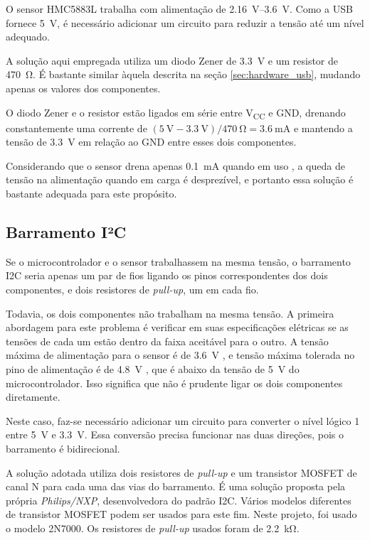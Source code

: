 \documentclass[brazil,pagestart=firstchapter]{abnt}
\newcommand*{\VCC}{V\textsubscript{CC}\xspace}
\newcommand*{\GND}{GND\xspace}
\begin{document}
O sensor HMC5883L trabalha com alimentação de \SIrange{2.16}{3.6}{\volt}.
\cite[p.~2]{HMC5883L} Como a \ac{USB} fornece \SI{5}{\volt}, é necessário
adicionar um circuito para reduzir a tensão até um nível adequado.

A solução aqui empregada utiliza um diodo Zener de \SI{3.3}{\volt} e um
resistor de \SI{470}{\ohm}. \cite{3vtipsandtricks} É bastante similar àquela
descrita na seção \ref{sec:hardware_usb}, mudando apenas os valores dos
componentes.

O diodo Zener e o resistor estão ligados em série entre \VCC e \GND,
drenando constantemente uma corrente de $ (\SI{5}{\volt} - \SI{3.3}{\volt})
/ \SI{470}{\ohm} = \SI{3.6}{\milli\ampere} $ e mantendo a tensão de
\SI{3.3}{\volt} em relação ao \GND entre esses dois componentes.

Considerando que o sensor drena apenas \SI{0.1}{\milli\ampere} quando em
uso \cite[p.~2]{HMC5883L}, a queda de tensão na alimentação quando em carga
é desprezível, e portanto essa solução é bastante adequada para este
propósito.

\subsection{Barramento I²C}
\label{sub:hardware_sensor_i2c}

Se o microcontrolador e o sensor trabalhassem na mesma tensão, o barramento
\ac{I2C} seria apenas um par de fios ligando os pinos correspondentes dos
dois componentes, e dois resistores de \textit{pull-up}, um em cada fio.

Todavia, os dois componentes não trabalham na mesma tensão. A primeira
abordagem para este problema é verificar em suas especificações elétricas se
as tensões de cada um estão dentro da faixa aceitável para o outro.
\cite[p.~9]{AN97055} A tensão máxima de alimentação para o sensor é de
\SI{3.6}{\volt} \cite[p.~2]{HMC5883L}, e tensão máxima tolerada no pino de
alimentação é de \SI{4.8}{\volt} \cite[p.~3]{HMC5883L}, que é abaixo da
tensão de \SI{5}{\volt} do microcontrolador. Isso significa que não é
prudente ligar os dois componentes diretamente.

Neste caso, faz-se necessário adicionar um circuito para converter o nível
lógico 1 entre \SI{5}{\volt} e \SI{3.3}{\volt}. Essa conversão precisa
funcionar nas duas direções, pois o barramento é bidirecional.

A solução adotada utiliza dois resistores de \textit{pull-up} e um
transistor MOSFET de canal N para cada uma das vias do barramento. É uma
solução proposta pela própria \textit{Philips/NXP}, desenvolvedora do padrão
\ac{I2C}. \cite[p.~10]{AN97055} \cite{AN10441} Vários modelos diferentes de
transistor MOSFET podem ser usados para este fim. Neste projeto, foi usado o
modelo 2N7000. Os resistores de \textit{pull-up} usados foram de
\SI{2.2}{\kilo\ohm}.
\end{document}
